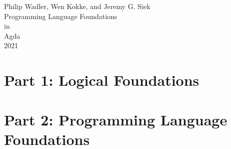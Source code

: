 \documentclass[10pt]{book}
\begin{document}
\setlength{\mathindent}{0pt}

\providecommand{\tightlist}{%
  \setlength{\itemsep}{0pt}\setlength{\parskip}{0pt}}

\newlength{\drop}
\newcommand*{\titleAM}{\begingroup%
\setlength{\drop}{0.12\textheight}
\centering
\vspace*{\drop}
{\large Philip Wadler, Wen Kokke, and Jeremy G. Siek}\\[\baselineskip]
\vspace*{\drop}
{\Huge Programming Language Foundations}\\[\baselineskip]
{\Huge in}\\[\baselineskip]
{\Huge Agda}\\[\drop]
\vfill
{\Large \scshape 2021}\par
\null\endgroup}


\begin{titlepage}
\titleAM
\end{titlepage}
\frontmatter
\setcounter{tocdepth}{0}
\tableofcontents
\setcounter{tocdepth}{1}





\mainmatter
\part{Part 1: Logical Foundations}
  
  
  
  
  
  
  
  
  
  
\part{Part 2: Programming Language Foundations}
  
  
  
  
  
  
  
  
  
\end{document}
